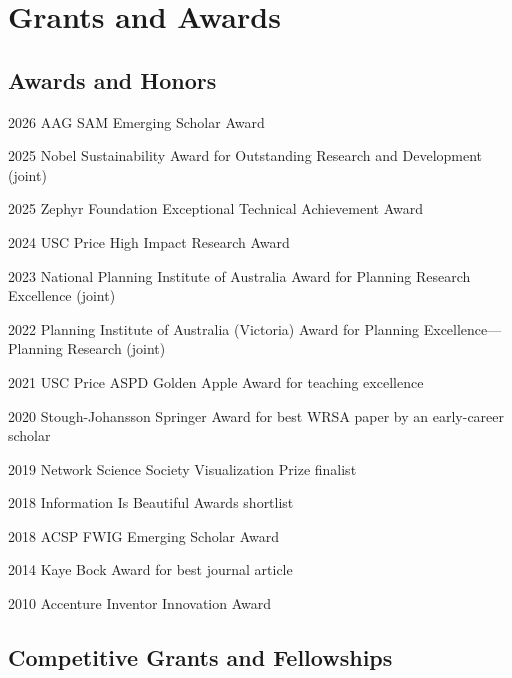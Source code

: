 \documentclass[11pt,letterpaper]{report} %
\begin{document}
\section*{Grants and Awards}

\subsection*{Awards and Honors}

\begin{tablist}

\item[2026] \tab{}AAG SAM Emerging Scholar Award
\item[2025] \tab{}Nobel Sustainability Award for Outstanding Research and Development (joint)
\item[2025] \tab{}Zephyr Foundation Exceptional Technical Achievement Award
\item[2024] \tab{}USC Price High Impact Research Award
\item[2023] \tab{}National Planning Institute of Australia Award for Planning Research Excellence (joint)
\item[2022] \tab{}Planning Institute of Australia (Victoria) Award for Planning Excellence---Planning Research (joint)
\item[2021] \tab{}USC Price ASPD Golden Apple Award for teaching excellence
\item[2020] \tab{}Stough-Johansson Springer Award for best WRSA paper by an early-career scholar
\item[2019] \tab{}Network Science Society Visualization Prize finalist
\item[2018] \tab{}Information Is Beautiful Awards shortlist
\item[2018] \tab{}ACSP FWIG Emerging Scholar Award
\item[2014] \tab{}Kaye Bock Award for best journal article
\item[2010] \tab{}Accenture Inventor Innovation Award

\end{tablist}

\subsection*{Competitive Grants and Fellowships}
\end{document}
